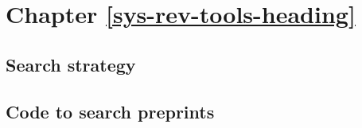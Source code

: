 \documentclass[a4paper, twoside]{templates/ociamthesis}
\begin{document}
\hypertarget{appendix-sys-rev-tools}{%
\section{Chapter \ref{sys-rev-tools-heading}}\label{appendix-sys-rev-tools}}

\hypertarget{appendix-search-strategy}{%
\subsection{Search strategy}\label{appendix-search-strategy}}

\hypertarget{appendix-medrxivr-code}{%
\subsection{Code to search preprints}\label{appendix-medrxivr-code}}
\end{document}
